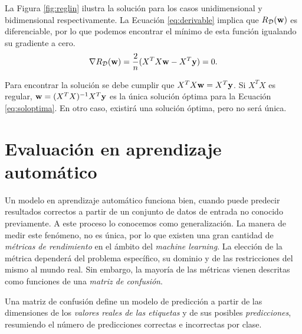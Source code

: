 \documentclass[oneside,openright,titlepage,numbers=noenddot,openany,headinclude,footinclude=true,
cleardoublepage=empty,abstractoff,BCOR=5mm,paper=a4,fontsize=12pt,main=spanish]{scrreprt}
\begin{document}
La Figura \ref{fig:reglin} ilustra la solución para los casos unidimensional y bidimensional respectivamente. La Ecuación \ref{eq:derivable} implica que $R_{\mathcal{D}}(\textbf{w})$ es diferenciable, por lo que podemos encontrar el mínimo de esta función igualando su gradiente a cero.
\begin{equation*}
    \nabla R_{\mathcal{D}}(\textbf{w}) = \frac{2}{n} (X^TX\textbf{w}-X^T\textbf{y}) = 0.
\end{equation*}

Para encontrar la solución se debe cumplir que $X^TX\textbf{w}=X^T\textbf{y}$. Si $X^TX$ es regular, $\textbf{w}=(X^TX)^{-1}X^T \textbf{y}$ es la única solución óptima para la Ecuación \ref{eq:soloptima}. En otro caso, existirá una solución óptima, pero no será única.

\section{Evaluación en aprendizaje automático}

\label{sec:evalaa}

Un modelo en aprendizaje automático funciona bien, cuando puede predecir resultados correctos a partir de un conjunto de datos de entrada no conocido previamente. A este proceso lo conocemos como generalización. La manera de medir este fenómeno, no es única, por lo que existen una gran cantidad de \textit{métricas de rendimiento} en el ámbito del \textit{machine learning}. La elección de la métrica dependerá del problema específico, su dominio y de las restricciones del mismo al mundo real. Sin embargo, la mayoría de las métricas vienen descritas como funciones de una \textit{matriz de confusión}. 

Una matriz de confusión define un modelo de predicción a partir de las dimensiones de los \textit{valores reales de las etiquetas} y de sus posibles \textit{predicciones}, resumiendo el número de predicciones correctas e incorrectas por clase.\\
\end{document}
